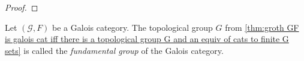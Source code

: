 \begin{proof}

\end{proof}

\begin{definition}
Let $(\mathscr{G},F)$ be a Galois category. The topological group $G$ from \cref{thm:groth GF is galois cat iff there is a topological group G and an equiv of cats to finite G sets} is called the \emph{fundamental group}  of the Galois category.
\end{definition}

